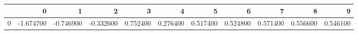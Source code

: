 \begin{tabular}{lrrrrrrrrrr}
\toprule
 & 0 & 1 & 2 & 3 & 4 & 5 & 6 & 7 & 8 & 9 \\
\midrule
0 & -1.674700 & -0.746900 & -0.332600 & 0.752400 & 0.276400 & 0.517400 & 0.524800 & 0.571400 & 0.556600 & 0.546100 \\
\bottomrule
\end{tabular}
